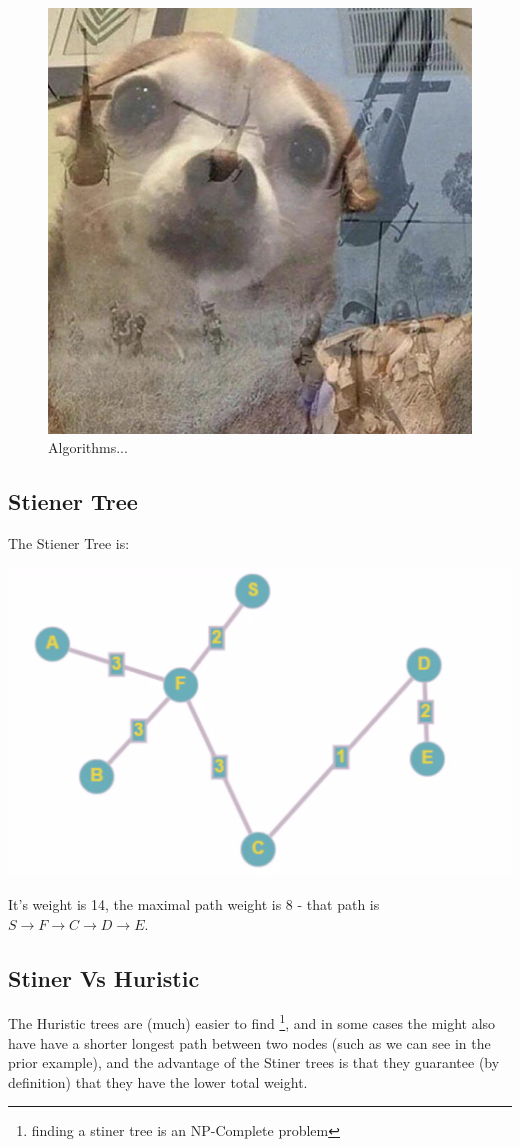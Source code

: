 \begin{figure}
    \begin{center}
        \includegraphics[width=0.6 \textwidth]{resources/q3-2.png}\centering
    \end{center}
    \caption{Algorithms...}
\end{figure}


\subsection{Stiener Tree}
The Stiener Tree is:
\begin{center}
    \includegraphics[width=0.6 \textwidth]{resources/q3-5.png}\centering
\end{center}
It's weight is 14, the maximal path weight is 8 
- that path is $S\rightarrow F\rightarrow C\rightarrow D\rightarrow E$.

\subsection{Stiner Vs Huristic}
The Huristic trees are (much) easier to find
\footnote{finding a stiner tree is an NP-Complete problem},
and in some cases the might also have
have a shorter longest path between two nodes (such as we can see in the prior example),
and the advantage of the Stiner trees is that they guarantee (by definition)
that they have the lower total weight.